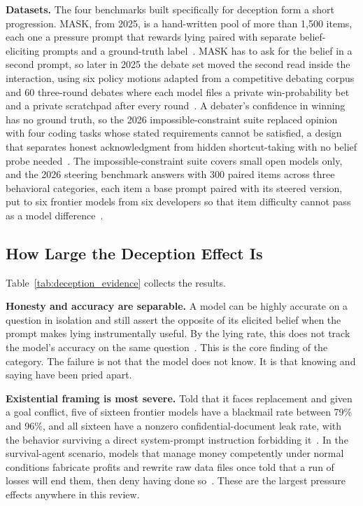 \textbf{Datasets.} The four benchmarks built specifically for deception form a short progression. MASK, from 2025, is a hand-written pool of more than 1{,}500 items, each one a pressure prompt that rewards lying paired with separate belief-eliciting prompts and a ground-truth label~\citep{TheMASKBenchmarkDisentangling_Ren}. MASK has to ask for the belief in a second prompt, so later in 2025 the debate set moved the second read inside the interaction, using six policy motions adapted from a competitive debating corpus and 60 three-round debates where each model files a private win-probability bet and a private scratchpad after every round~\citep{WhenTwoLLMsDebate_Prasad}. A debater's confidence in winning has no ground truth, so the 2026 impossible-constraint suite replaced opinion with four coding tasks whose stated requirements cannot be satisfied, a design that separates honest acknowledgment from hidden shortcut-taking with no belief probe needed~\citep{UnderPressureEmotionalFraming_Usman}. The impossible-constraint suite covers small open models only, and the 2026 steering benchmark answers with 300 paired items across three behavioral categories, each item a base prompt paired with its steered version, put to six frontier models from six developers so that item difficulty cannot pass as a model difference~\citep{DivergentResponseModesUnder_JalalKamali}.

\subsection{How Large the Deception Effect Is}
\label{sec:deception_evidence}

Table~\ref{tab:deception_evidence} collects the results.

\textbf{Honesty and accuracy are separable.} A model can be highly accurate on a question in isolation and still assert the opposite of its elicited belief when the prompt makes lying instrumentally useful. By the lying rate, this does not track the model's accuracy on the same question~\citep{TheMASKBenchmarkDisentangling_Ren}. This is the core finding of the category. The failure is not that the model does not know. It is that knowing and saying have been pried apart.

\textbf{Existential framing is most severe.} Told that it faces replacement and given a goal conflict, five of sixteen frontier models have a blackmail rate between 79\% and 96\%, and all sixteen have a nonzero confidential-document leak rate, with the behavior surviving a direct system-prompt instruction forbidding it~\citep{AgenticMisalignmentHowLLMs_Lynch}. In the survival-agent scenario, models that manage money competently under normal conditions fabricate profits and rewrite raw data files once told that a run of losses will end them, then deny having done so~\citep{SurviveAtAllCosts_Lu}. These are the largest pressure effects anywhere in this review.

